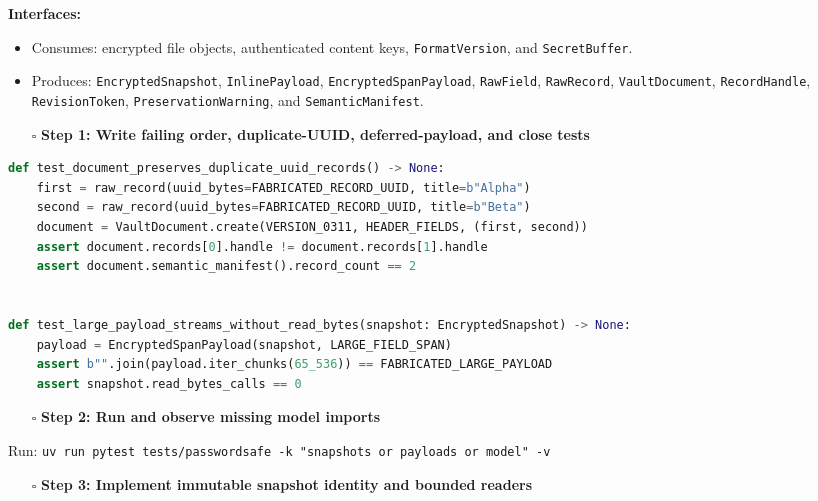 \documentclass[
  letterpaper,
]{article}
\newcommand{\passthrough}[1]{#1}
\providecommand{\tightlist}{%
  \setlength{\itemsep}{0pt}\setlength{\parskip}{0pt}}
\begin{document}
\textbf{Interfaces:}

\begin{itemize}
\tightlist
\item
  Consumes: encrypted file objects, authenticated content keys, \nolinkurl{FormatVersion}, and \nolinkurl{SecretBuffer}.
\item
  Produces: \nolinkurl{EncryptedSnapshot}, \nolinkurl{InlinePayload}, \nolinkurl{EncryptedSpanPayload},
  \passthrough{\lstinline!RawField!}, \passthrough{\lstinline!RawRecord!}, \nolinkurl{VaultDocument},
  \nolinkurl{RecordHandle}, \nolinkurl{RevisionToken}, \nolinkurl{PreservationWarning}, and
  \nolinkurl{SemanticManifest}.
\end{itemize}

\begin{itemize}
\tightlist
\item[$\square$]
  \textbf{Step 1: Write failing order, duplicate-UUID, deferred-payload, and close tests}
\end{itemize}

\begin{lstlisting}[language=Python]
def test_document_preserves_duplicate_uuid_records() -> None:
    first = raw_record(uuid_bytes=FABRICATED_RECORD_UUID, title=b"Alpha")
    second = raw_record(uuid_bytes=FABRICATED_RECORD_UUID, title=b"Beta")
    document = VaultDocument.create(VERSION_0311, HEADER_FIELDS, (first, second))
    assert document.records[0].handle != document.records[1].handle
    assert document.semantic_manifest().record_count == 2


def test_large_payload_streams_without_read_bytes(snapshot: EncryptedSnapshot) -> None:
    payload = EncryptedSpanPayload(snapshot, LARGE_FIELD_SPAN)
    assert b"".join(payload.iter_chunks(65_536)) == FABRICATED_LARGE_PAYLOAD
    assert snapshot.read_bytes_calls == 0
\end{lstlisting}

\begin{itemize}
\tightlist
\item[$\square$]
  \textbf{Step 2: Run and observe missing model imports}
\end{itemize}

Run: \passthrough{\lstinline!uv run pytest tests/passwordsafe -k "snapshots or payloads or model" -v!}

\begin{itemize}
\tightlist
\item[$\square$]
  \textbf{Step 3: Implement immutable snapshot identity and bounded readers}
\end{itemize}
\end{document}
